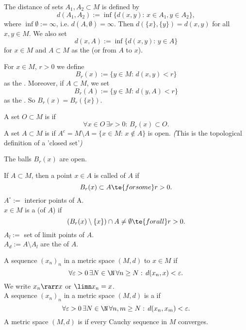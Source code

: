 \begin{definition*}
The distance of sets \(A_1, A_2 \subset M\) is defined by 
\[d(A_1,A_2):=\inf\{d(x,y):\,x\in A_1,y\in A_2\},\]
where $\inf\emptyset:=\infty$, i.e. $d(A,\emptyset)=\infty$. Then $d(\{x\},\{y\})=d(x,y)$ for all $x,y\in M$. We also set
\[d(x,A):=\inf\{d(x,y):\,y\in A\}\]
for $x\in M$ and $A\subset M$ as the  (or from $A$ to $x$).
\end{definition*}

\begin{definition}\label{i.3}
For $x\in M$, $r>0$ we define 
\[B_r(x):=\{y\in M:\,d(x,y)<r\}\]
as the . Moreover, if $A\subset M$, we set
\[B_r(A):=\{y\in M:\,d(y,A)<r\}\]
as the . So $B_r(x)=B_r(\{x\})$. 
\end{definition}

\begin{definition}\label{i.5}
A set $O\subset M$ is  if
\[\forall x\in O\,\exists r>0:\,B_r(x)\subset O.\]
A set $A\subset M$ is  if $A^c=M\setminus A=\{x\in M:\, x\notin A\}$ is open. 
\emph{(}This is the topological definition of a 'closed set'\emph{)}

The balls \(B_r(x)\) are open.
\end{definition}

\begin{definition}
If $A\subset M$, then a point $x\in A$ is called  of $A$ if 
\[B_r(x)\subset A\te{ for some }r>0.\]
$A^\circ:=$ interior points of A.\vspace{1mm}\\
$x\in M$ is a  (of $A$) if 
\[\left(B_r(x)\setminus\{x\}\right)\cap A\neq\emptyset\te{ for all }r>0.\]
$A_l:=$ set of limit points of $A$.\vspace{1mm}\\
$A_d:=A\setminus A_l$ are the  of $A$.
\end{definition}

\begin{definition}[Convergence]\label{i.6}
A sequence $(x_n)_n$ in a metric space $(M,d)$  to $x\in M$ if
\[\forall\varepsilon>0\,\exists N\in\N\,\forall n\geq N:\, d(x_n,x)<\varepsilon.\]
We write $x_n\rarr x$ or $\limn x_n=x$.\\
A sequence $(x_n)_n$ in a metric space $(M,d)$ is a  if
\[\forall\varepsilon>0\,\exists N\in\N\,\forall n,m\geq N:\,d(x_n,x_m)<\varepsilon.\]
A metric space $(M,d)$ is  if every Cauchy sequence in $M$ converges.
\end{definition}


